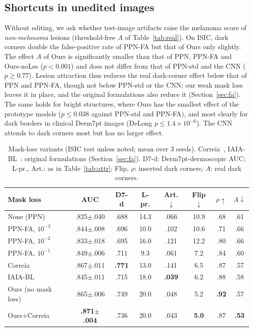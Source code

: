 \documentclass[conference]{IEEEtran}
\begin{document}
\subsection{Shortcuts in unedited images}
\label{sec:real}
Without editing, we ask whether test-image artifacts raise the melanoma score of \emph{non-melanoma} lesions (threshold-free $A$ of Table~\ref{tab:real}). On ISIC, dark corners double the false-positive rate of PPN-FA but that of Ours only slightly. The effect $A$ of Ours is significantly smaller than that of PPN, PPN-FA and Ours-noLes ($p<0.001$) and does not differ from that of PPN-std and the CNN ($p\geq0.77$). Lesion attraction thus reduces the real dark-corner effect below that of PPN and PPN-FA, though not below PPN-std or the CNN; our weak mask loss leaves it in place, and the original formulations also reduce it (Section~\ref{sec:fa}). The same holds for bright structures, where Ours has the smallest effect of the prototype models ($p\leq0.038$ against PPN-std and PPN-FA), and most clearly for dark borders in clinical Derm7pt images (DeLong $p\leq1.4\times10^{-6}$). The CNN attends to dark corners most but has no larger effect.

\begin{table}[t]
\caption{Mask-loss variants (ISIC test unless noted; mean over 3 seeds). Correia~\cite{correia2023}, IAIA-BL~\cite{barnett2021}: original formulations (Section~\ref{sec:fa}). D7-d: Derm7pt-dermoscopic AUC; L-pr., Art.: as in Table~\ref{tab:attr}; Flip, $\rho$: inserted dark corners; $A$: real dark corners.}
\label{tab:fa}
\centering
\scriptsize
\setlength{\tabcolsep}{2.4pt}
\begin{tabular}{lccccccc}
\toprule
Mask loss & AUC & D7-d & L-pr. & Art.$\downarrow$ & Flip$\downarrow$ & $\rho\uparrow$ & $A\downarrow$ \\
\midrule
None (PPN) & .825$\pm$.040 & .688 & 14.3 & .066 & 10.9 & .68 & .61 \\
PPN-FA, $10^{-3}$ & .844$\pm$.008 & .696 & 10.0 & .102 & 10.6 & .71 & .66 \\
PPN-FA, $10^{-2}$ & .833$\pm$.018 & .695 & 16.0 & .121 & 12.2 & .80 & .66 \\
PPN-FA, $10^{-1}$ & .849$\pm$.006 & .711 & 9.3 & .061 & 7.2 & .84 & .60 \\
Correia & .867$\pm$.011 & \textbf{.771} & 13.0 & .141 & 6.5 & .87 & .57 \\
IAIA-BL & .845$\pm$.011 & .715 & 18.0 & \textbf{.039} & 6.2 & .88 & .58 \\
\midrule
Ours (no mask loss) & .865$\pm$.006 & .749 & 20.0 & .048 & 5.2 & \textbf{.92} & .57 \\
Ours+Correia & \textbf{.871$\pm$.004} & .736 & 20.0 & .043 & \textbf{5.0} & .87 & \textbf{.53} \\
\bottomrule
\end{tabular}
\end{table}
\end{document}
